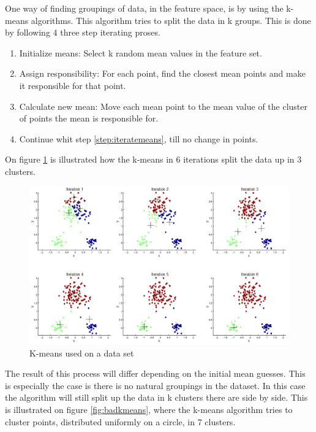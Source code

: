 One way of finding groupings of data, in the feature space, is by using the k-means algorithms. This algorithm tries to split the data in k groups. This is done by following 4 three step iterating proses. 

\begin{enumerate}
  \item Initialize means: Select k random mean values in the feature set. 
  \item Assign responsibility: For each point, find the closest mean points and make it responsible for that point.
  \label{step:iteratemeans} 
  \item Calculate new mean: Move each mean point to the mean value of the cluster of points the mean is responsible for. 
  \item Continue whit step \ref{step:iteratemeans}, till no change in points. 
\end{enumerate}

On figure \ref{fig:kmeans} is illustrated how the k-means in 6 iterations split the data up in 3 clusters.

\begin{figure}[H]
\centering
\includegraphics[scale=0.6]{billeder/kmeansclustering}
\caption{K-means used on a data set}
\label{fig:kmeans}
\end{figure}

The result of this process will differ depending on the initial mean guesses. This is especially the case is there is no natural groupings in the dataset. In this case the algorithm will still split up the data in k clusters there are side by side. This is illustrated on figure \ref{fig:badkmeans}, where the k-means algorithm tries to cluster points, distributed uniformly on a circle, in 7 clusters. 

